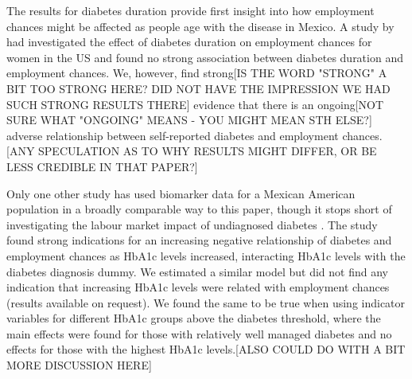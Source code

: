 The results for diabetes duration provide first insight into how employment
chances might be affected as people age with the disease in Mexico.
A study by \citet{Minor2013} had investigated the effect of diabetes
duration on employment chances for women in the US and found no strong
association between diabetes duration and employment chances. We,
however, find strong[IS THE WORD "STRONG" A BIT TOO STRONG HERE? DID NOT HAVE THE IMPRESSION WE HAD SUCH STRONG RESULTS THERE] evidence that there is an ongoing[NOT SURE WHAT "ONGOING" MEANS - YOU MIGHT MEAN STH ELSE?] adverse relationship
 between self-reported diabetes and employment chances. [ANY SPECULATION AS TO WHY RESULTS MIGHT DIFFER, OR BE LESS CREDIBLE IN THAT PAPER?] 

Only one other study has used biomarker data for a Mexican American
population in a broadly comparable way to this paper, though it stops short of investigating
the labour market impact of undiagnosed diabetes \citep{BrownIII2011}. The study found strong indications
for an increasing negative relationship of diabetes and employment
chances as \ac{HbA1c} levels increased, interacting \ac{HbA1c} levels
with the diabetes diagnosis dummy. We estimated a similar model but
did not find any indication that increasing \ac{HbA1c} levels were
related with employment chances (results available on request). We
found the same to be true when using indicator variables for different
\ac{HbA1c} groups above the diabetes threshold, where the main effects
were found for those with relatively well managed diabetes and no
effects for those with the highest \ac{HbA1c} levels.[ALSO COULD DO WITH A BIT MORE DISCUSSION HERE]

